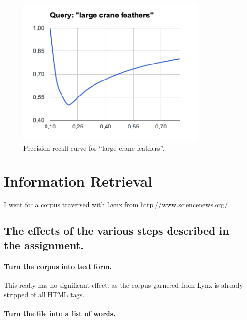 \documentclass[11pt,a4paper]{article}
\begin{document}
      \begin{figure}[h]
        \includegraphics[width=0.85\textwidth]{imgs/large_crane_feathers_pr}
        \caption{Precision-recall curve for ``large crane feathers''.}
        \label{fig:pr3}
      \end{figure}



  \section{Information Retrieval} %
  \label{sec:information_retrieval}

    I went for a corpus traversed with Lynx from \url{http://www.sciencenews.org/}.

    \subsection{The effects of the various steps described in the assignment.}

      \paragraph{Turn the corpus into text form.}

      This really has no significant effect, as the corpus garnered from Lynx is already stripped of all HTML tags.

      \paragraph{Turn the file into a list of words.}
\end{document}
